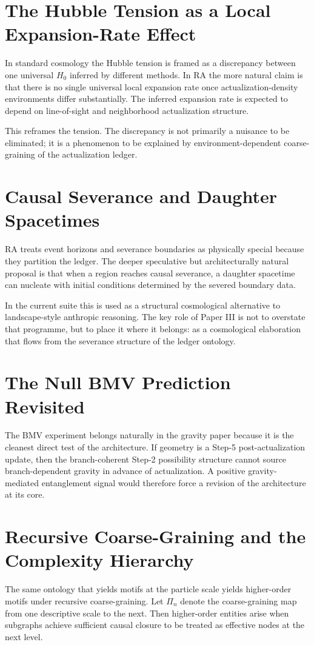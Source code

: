 \documentclass[11pt]{article}
\begin{document}
\section{The Hubble Tension as a Local Expansion-Rate Effect}
In standard cosmology the Hubble tension is framed as a discrepancy between one universal $H_0$ inferred by different methods. In RA the more natural claim is that there is no single universal local expansion rate once actualization-density environments differ substantially. The inferred expansion rate is expected to depend on line-of-sight and neighborhood actualization structure.

This reframes the tension. The discrepancy is not primarily a nuisance to be eliminated; it is a phenomenon to be explained by environment-dependent coarse-graining of the actualization ledger.

\section{Causal Severance and Daughter Spacetimes}
RA treats event horizons and severance boundaries as physically special because they partition the ledger. The deeper speculative but architecturally natural proposal is that when a region reaches causal severance, a daughter spacetime can nucleate with initial conditions determined by the severed boundary data.

In the current suite this is used as a structural cosmological alternative to landscape-style anthropic reasoning. The key role of Paper III is not to overstate that programme, but to place it where it belongs: as a cosmological elaboration that flows from the severance structure of the ledger ontology.

\section{The Null BMV Prediction Revisited}
The BMV experiment belongs naturally in the gravity paper because it is the cleanest direct test of the architecture. If geometry is a Step-5 post-actualization update, then the branch-coherent Step-2 possibility structure cannot source branch-dependent gravity in advance of actualization. A positive gravity-mediated entanglement signal would therefore force a revision of the architecture at its core.

\section{Recursive Coarse-Graining and the Complexity Hierarchy}
The same ontology that yields motifs at the particle scale yields higher-order motifs under recursive coarse-graining. Let $\Pi_n$ denote the coarse-graining map from one descriptive scale to the next. Then higher-order entities arise when subgraphs achieve sufficient causal closure to be treated as effective nodes at the next level.
\end{document}
